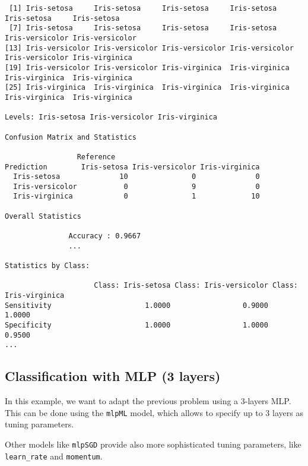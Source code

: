 \documentclass{article}
\begin{document}
\begin{lstlisting}
 [1] Iris-setosa     Iris-setosa     Iris-setosa     Iris-setosa     Iris-setosa     Iris-setosa    
 [7] Iris-setosa     Iris-setosa     Iris-setosa     Iris-setosa     Iris-versicolor Iris-versicolor
[13] Iris-versicolor Iris-versicolor Iris-versicolor Iris-versicolor Iris-versicolor Iris-virginica 
[19] Iris-versicolor Iris-versicolor Iris-virginica  Iris-virginica  Iris-virginica  Iris-virginica 
[25] Iris-virginica  Iris-virginica  Iris-virginica  Iris-virginica  Iris-virginica  Iris-virginica 

Levels: Iris-setosa Iris-versicolor Iris-virginica

Confusion Matrix and Statistics

                 Reference
Prediction        Iris-setosa Iris-versicolor Iris-virginica
  Iris-setosa              10               0              0
  Iris-versicolor           0               9              0
  Iris-virginica            0               1             10

Overall Statistics
                                          
               Accuracy : 0.9667          
               ...            

Statistics by Class:

                     Class: Iris-setosa Class: Iris-versicolor Class: Iris-virginica
Sensitivity                      1.0000                 0.9000                1.0000
Specificity                      1.0000                 1.0000                0.9500
...

\end{lstlisting}

\pagebreak

\subsection{Classification with MLP (3 layers)}
In this example, we want to adapt the previous problem using a 3-layers MLP.\\

This can be done using the \texttt{mlpML} model, which allows to specify up to 3 layers as tuning parameters.\\



\vspace{5mm}

Other models like \texttt{mlpSGD} provide also more sophisticated tuning parameters, like \texttt{learn\_rate} and \texttt{momentum}.\\
\end{document}
